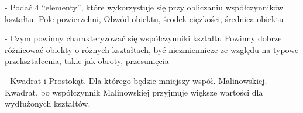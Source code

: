 \documentclass[a4paper, 12pt, titlepage]{article}
\begin{document}
- Podać 4 “elementy”, które wykorzystuje się przy obliczaniu współczynników kształtu.
Pole powierzchni, Obwód obiektu, środek ciężkości, średnica obiektu

- Czym powinny charakteryzować się współczynniki kształtu
Powinny dobrze różnicować obiekty o różnych kształtach,
być niezmiennicze ze względu na typowe przekształcenia, takie jak obroty, przesunięcia

- Kwadrat i Prostokąt. Dla którego będzie mniejszy współ. Malinowskiej.
Kwadrat, bo współczynnik Malinowskiej przyjmuje większe wartości dla wydłużonych kształtów.

\end{document}
